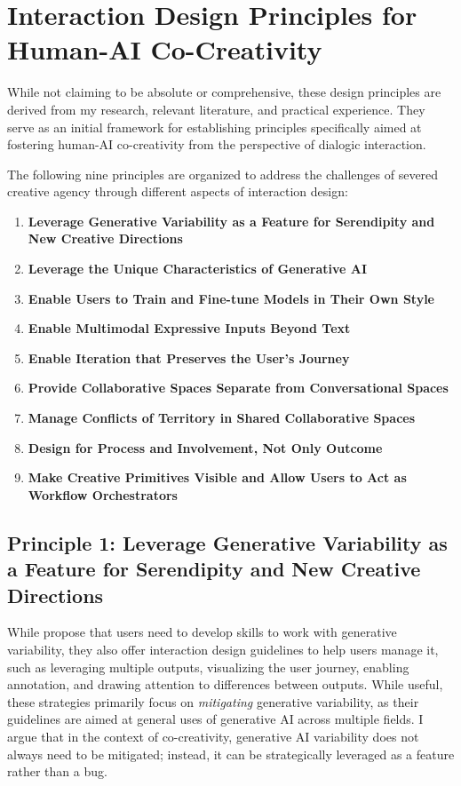 \section{Interaction Design Principles for Human-AI Co-Creativity}

While not claiming to be absolute or comprehensive, these design principles are derived from my research, relevant literature, and practical experience. They serve as an initial framework for establishing principles specifically aimed at fostering human-AI co-creativity from the perspective of dialogic interaction.

The following nine principles are organized to address the challenges of severed creative agency through different aspects of interaction design:

\begin{enumerate}
    \item \textbf{Leverage Generative Variability as a Feature for Serendipity and New Creative Directions}
    \item \textbf{Leverage the Unique Characteristics of Generative AI}
    \item \textbf{Enable Users to Train and Fine-tune Models in Their Own Style}
    \item \textbf{Enable Multimodal Expressive Inputs Beyond Text}
    \item \textbf{Enable Iteration that Preserves the User's Journey}
    \item \textbf{Provide Collaborative Spaces Separate from Conversational Spaces}
    \item \textbf{Manage Conflicts of Territory in Shared Collaborative Spaces}
    \item \textbf{Design for Process and Involvement, Not Only Outcome}
    \item \textbf{Make Creative Primitives Visible and Allow Users to Act as Workflow Orchestrators}
\end{enumerate}

\subsection{Principle 1: Leverage Generative Variability as a Feature for Serendipity and New Creative Directions}

While \cite{Weisz2024-io} propose that users need to develop skills to work with generative variability, they also offer interaction design guidelines to help users manage it, such as leveraging multiple outputs, visualizing the user journey, enabling annotation, and drawing attention to differences between outputs. While useful, these strategies primarily focus on \textit{mitigating} generative variability, as their guidelines are aimed at general uses of generative AI across multiple fields. I argue that in the context of co-creativity, generative AI variability does not always need to be mitigated; instead, it can be strategically leveraged as a feature rather than a bug.

